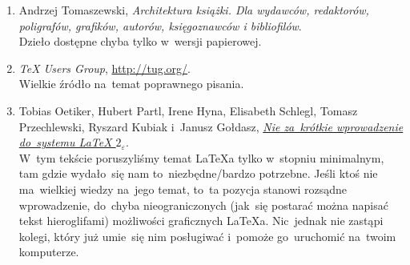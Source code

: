 \documentclass[a4paper,11pt]{article}
\begin{document}
\begin{enumerate}
\item Andrzej Tomaszewski, \emph{Architektura książki. Dla wydawców, redaktorów, poligrafów, grafików, autorów, księgoznawców i bibliofilów}. \\
  Dzieło dostępne chyba tylko w~wersji papierowej.
  
\item \emph{\TeX{} Users Group},
  \href{http://tug.org/}{http://tug.org/}. \\
  Wielkie źródło na~temat poprawnego pisania.

\item Tobias Oetiker, Hubert Partl, Irene Hyna, Elisabeth Schlegl,
  Tomasz Przechlewski, Ryszard Kubiak i~Janusz Gołdasz, \href{http://www.ptep-online.com/ctan/lshort_polish.pdf}{\emph{Nie za~krótkie wprowadzenie do~systemu \LaTeX{} $2_{ \varepsilon }$}}. \\
  W~tym tekście poruszyliśmy temat \LaTeX a tylko w~stopniu
  minimalnym, tam gdzie wydało~się nam to~niezbędne/bardzo potrzebne.
  Jeśli ktoś nie ma~wielkiej wiedzy na~jego temat, to~ta pozycja
  stanowi rozsądne wprowadzenie, do~chyba nieograniczonych (jak~się
  postarać można napisać tekst hieroglifami) możliwości graficznych
  \LaTeX a. Nic~jednak nie zastąpi kolegi, który już umie~się nim
  posługiwać i~pomoże go~uruchomić na~twoim komputerze.

\end{enumerate}






\end{document}
